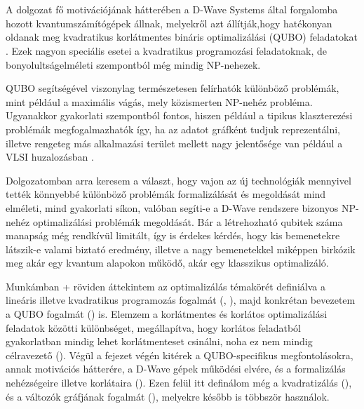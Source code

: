 
\chapter{\bevezetes}

A dolgozat fő motivációjának hátterében a D-Wave Systems által forgalomba hozott kvantumszámítógépek állnak, melyekről azt állítják,hogy hatékonyan oldanak meg kvadratikus korlátmentes bináris optimalizálási (QUBO) feladatokat \cite{DWaveSystem}. Ezek nagyon speciális esetei a kvadratikus programozási feladatoknak, de bonyolultságelméleti szempontból még mindig NP-nehezek.

QUBO segítségével viszonylag természetesen felírhatók különböző problémák, mint például a maximális vágás, mely közismerten NP-nehéz probléma. Ugyanakkor gyakorlati szempontból fontos, hiszen például a tipikus klaszterezési problémák megfogalmazhatók így, ha az adatot gráfként tudjuk reprezentálni, illetve rengeteg más alkalmazási terület mellett nagy jelentősége van például a VLSI huzalozásban \cite{wiki:VLSI}\cite{wiki:Maximum_cut}.

Dolgozatomban arra keresem a választ, hogy vajon az új technológiák mennyivel tették könnyebbé különböző problémák formalizálását és megoldását mind elméleti, mind gyakorlati síkon, valóban segíti-e a D-Wave rendszere bizonyos NP-nehéz optimalizálási problémák megoldását. Bár a létrehozható qubitek száma manapság még rendkívül limitált, így is érdekes kérdés, hogy kis bemenetekre látszik-e valami biztató eredmény, illetve a nagy bemenetekkel miképpen birkózik meg akár egy kvantum alapokon működő, akár egy klasszikus optimalizáló.

Munkámban \az+ röviden áttekintem az optimalizálás témakörét definiálva a lineáris illetve kvadratikus programozás fogalmát (, ), majd konkrétan bevezetem a QUBO fogalmát () is. Elemzem a korlátmentes és korlátos optimalizálási feladatok közötti különbséget, megállapítva, hogy korlátos feladatból gyakorlatban mindig lehet korlátmenteset csinálni, noha ez nem mindig célravezető ().
Végül a fejezet végén kitérek a QUBO-specifikus megfontolásokra, annak motivációs hátterére, a D-Wave gépek működési elvére, és a formalizálás nehézségeire illetve korlátaira (). Ezen felül itt definálom még a kvadratizálás (), és a változók gráfjának fogalmát (), melyekre később is többször használok.

